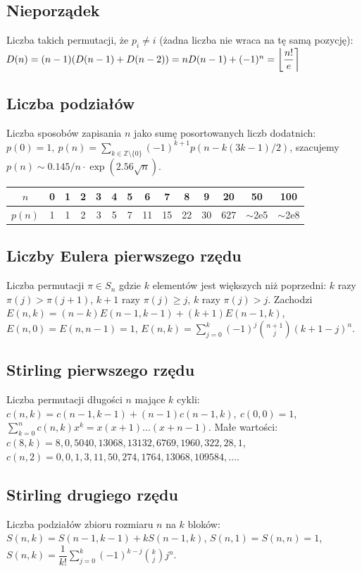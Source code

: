 	\subsection{Nieporządek}
		Liczba takich permutacji, że $p_i \neq i$ (żadna liczba nie wraca na tę samą pozycję):
		$ \mkern-2mu D(n) = (n-1)(D(n-1)+D(n-2)) = n D(n-1)+(-1)^n = \left\lfloor\dfrac{n!}{e}\right\rceil $

	\subsection{Liczba podziałów}
		Liczba sposobów zapisania $n$ jako sumę posortowanych liczb dodatnich:
		$ p(0) = 1,\ p(n) = \sum_{k \in \mathbb Z \setminus \{0\}}{(-1)^{k+1} p(n - k(3k-1) / 2)} $,
		szacujemy $ p(n) \sim 0.145 / n \cdot \exp(2.56 \sqrt{n}) $.
		\begin{tabular}{c|c@{\ }c@{\ }c@{\ }c@{\ }c@{\ }c@{\ }c@{\ }c@{\ }c@{\ }c@{\ }c@{\ }c@{\ }c}
			$n$    & 0 & 1 & 2 & 3 & 4 & 5 & 6  & 7  & 8  & 9  & 20  & 50  & 100 \\ \hline
			$p(n)$ & 1 & 1 & 2 & 3 & 5 & 7 & 11 & 15 & 22 & 30 & 627 & $\mathtt{\sim}$2e5 & $\mathtt{\sim}$2e8 \\
		\end{tabular}
	\subsection{Liczby Eulera pierwszego rzędu}
		Liczba permutacji $\pi \in S_n$ gdzie $k$ elementów jest większych niż poprzedni: $k$ razy $\pi(j)>\pi(j+1)$, $k+1$ razy $\pi(j)\geq j$, $k$ razy $\pi(j)>j$.
		Zachodzi
		$E(n,k) = (n-k)E(n-1,k-1) + (k+1)E(n-1,k)$,
		$E(n,0) = E(n,n-1) = 1$,
		$E(n,k) = \sum_{j=0}^k(-1)^j\binom{n+1}{j}(k+1-j)^n$.

	\subsection{Stirling pierwszego rzędu}
		Liczba permutacji długości $n$ mające $k$ cykli:
			$c(n,k) = c(n-1,k-1) + (n-1) c(n-1,k),\ c(0,0) = 1$,
			$\textstyle \sum_{k=0}^n c(n,k)x^k = x(x+1) \dots (x+n-1)$.
		Małe wartości:
		$c(8,k) = 8, 0, 5040, 13068, 13132, 6769, 1960, 322, 28, 1$,
		$c(n,2) = 0, 0, 1, 3, 11, 50, 274, 1764, 13068, 109584, \dots$.

	\subsection{Stirling drugiego rzędu}
		Liczba podziałów zbioru rozmiaru $n$ na $k$ bloków:
		$S(n,k) = S(n-1,k-1) + k S(n-1,k)$,
		$S(n,1) = S(n,n) = 1$,
		$S(n,k) = \dfrac{1}{k!}\sum_{j=0}^k (-1)^{k-j}\binom{k}{j}j^n$.

